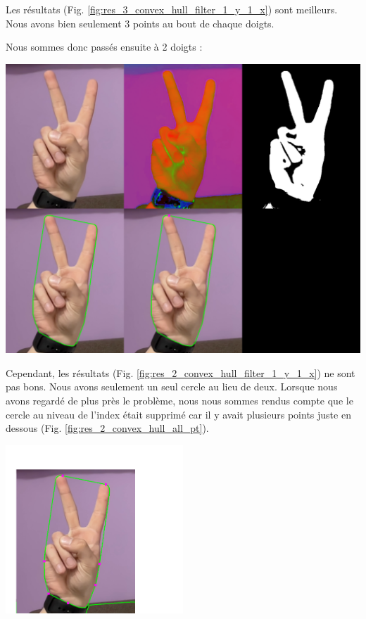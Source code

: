 \documentclass[11pt]{article}
\begin{document}
Les résultats (Fig. \ref{fig:res_3_convex_hull_filter_1_y_1_x}) sont meilleurs. Nous avons bien seulement 3 points au bout de chaque doigts. \bigbreak

Nous sommes donc passés ensuite à 2 doigts :
\begin{center}
    \includegraphics[width=\textwidth]{images/res_2_convex_hull_filter_1_y_1_x.png}
    \label{fig:res_2_convex_hull_filter_1_y_1_x}
\end{center}

Cependant, les résultats (Fig. \ref{fig:res_2_convex_hull_filter_1_y_1_x}) ne sont pas bons. Nous avons seulement un seul cercle au lieu de deux. Lorsque nous avons regardé de plus près le problème, nous nous sommes rendus compte que le cercle au niveau de l'index était supprimé car il y avait plusieurs points juste en dessous (Fig. \ref{fig:res_2_convex_hull_all_pt}).  \bigbreak

\begin{center}
    \includegraphics[width=0.5\textwidth]{images/res_2_convex_hull_all_pt.png}
    \label{fig:res_2_convex_hull_all_pt}
\end{center}
\end{document}
